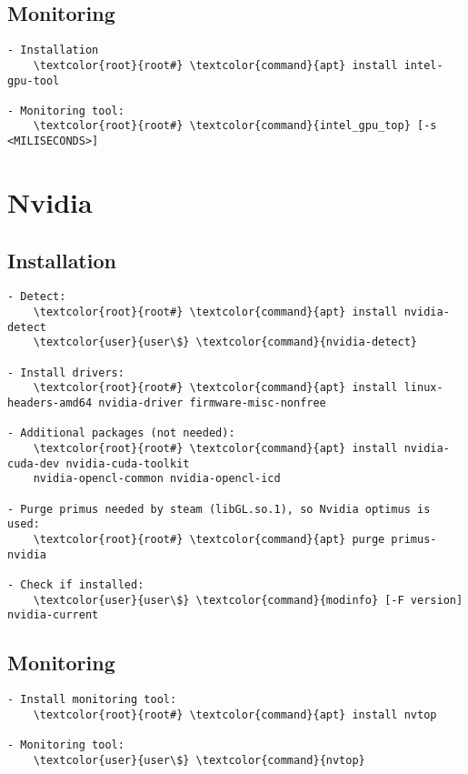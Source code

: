 \documentclass[10pt, a4paper, onecolumn, openany]{book} %
\begin{document}
\subsection{Monitoring}
\begin{Verbatim}[commandchars=\\\{\}]
- Installation
    \textcolor{root}{root#} \textcolor{command}{apt} install intel-gpu-tool
    
- Monitoring tool:
    \textcolor{root}{root#} \textcolor{command}{intel_gpu_top} [-s <MILISECONDS>]
\end{Verbatim}

\section{Nvidia}
\subsection{Installation}
\begin{Verbatim}[commandchars=\\\{\}]
- Detect:
    \textcolor{root}{root#} \textcolor{command}{apt} install nvidia-detect
    \textcolor{user}{user\$} \textcolor{command}{nvidia-detect}

- Install drivers:
    \textcolor{root}{root#} \textcolor{command}{apt} install linux-headers-amd64 nvidia-driver firmware-misc-nonfree

- Additional packages (not needed):
    \textcolor{root}{root#} \textcolor{command}{apt} install nvidia-cuda-dev nvidia-cuda-toolkit    
    nvidia-opencl-common nvidia-opencl-icd
    
- Purge primus needed by steam (libGL.so.1), so Nvidia optimus is used:
    \textcolor{root}{root#} \textcolor{command}{apt} purge primus-nvidia
    
- Check if installed:
    \textcolor{user}{user\$} \textcolor{command}{modinfo} [-F version] nvidia-current
\end{Verbatim}
\subsection{Monitoring}
\begin{Verbatim}[commandchars=\\\{\}]
- Install monitoring tool:
    \textcolor{root}{root#} \textcolor{command}{apt} install nvtop
    
- Monitoring tool:
    \textcolor{user}{user\$} \textcolor{command}{nvtop}
\end{Verbatim}
\end{document}
